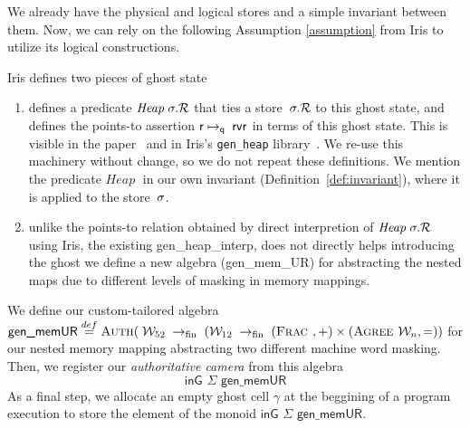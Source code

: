 We already have the physical and logical stores and a simple invariant between them. Now, we can rely on the following Assumption \ref{assumption} from Iris to utilize its logical constructions.
\newcommand{\genheapinterp}[1]{\mathit{Heap}\;#1}
\newcommand{\genmemheapinterp}[1]{\mathit{MemHeap}\;#1}
\newcommand{\pred}[1]{\ownGhost\gammaPred{\authfull{(\mapone\predstore)}}}
\newcommand{\mapone}[1]{1.#1}
\newcommand{\mapsfromexact}[3]{
  \ownGhost\gammaPred{\authfrag{\singletonMap{#1}{(#2, #3)}}}
}
\newcommand{\sh}{L'}
\newcommand{\mapsfromdef}[3]{
  \exists\sh.\;
  \mapsfromexact{#1}{#2}{\sh} \star \pure{\sh \subseteq #3}
}

\begin{assumption}
\label{assumption}
Iris defines two pieces of ghost state
\begin{enumerate}
\item  defines a predicate $\genheapinterp\store.\mathcal{R}$
  that ties a store~$\sigma.\mathcal{R}$ to this ghost state,
  and defines the points-to assertion $\mathsf{r}\mapsto_{\mathsf{q}}\;\mathsf{rv}\mathsf{r}$
  in terms of this ghost state.
  This is visible in the paper~\cite[\S6.3.2]{iris}
  and in Iris's \texttt{gen\_heap} library~\cite{genheap}.
  We re-use this machinery without change,
  so we do not repeat these definitions.
  We mention the predicate $\genheapinterp\!$
  in our own invariant (Definition~\ref{def:invariant}),
  where it is applied to the \logical store~$\sigma$.
\item unlike the points-to relation obtained by direct interpretion of $\genheapinterp\store.\mathcal{R}$ using Iris, the existing \textsf{gen\_heap\_interp},
  does not directly helps introducing the ghost we define a new algebra (\textsf{gen\_mem\_UR}) for abstracting the nested maps due to different levels of masking in memory mappings. 
\end{enumerate}
\end{assumption}

\begin{definition}
We define our custom-tailored algebra 
\newcommand\fpfn{\rightarrow_{\textrm{fin}}}
\( \textsf{gen\_memUR} \stackrel{def}{=}
  \authm(\;
  \Locft \;\fpfn\;
  (\Loctw \;\fpfn\;  (\textsc{Frac }, \mathord{+}) \times (\textsc{Agree } \Loc,\mathord{=}) )
  \)
  for our nested memory mapping abstracting two different machine word masking. Then, we register our \emph{authoritative camera} \cite[\S6.3.3]{iris} from this algebra
\[\textsf{inG } \Sigma \textsf{ gen\_memUR} \]
As a final step, we allocate an empty ghost cell $\gamma$ at the beggining of a program execution to store the element of the monoid $\textsf{inG } \Sigma \textsf{ gen\_memUR}$.
\end{definition}

